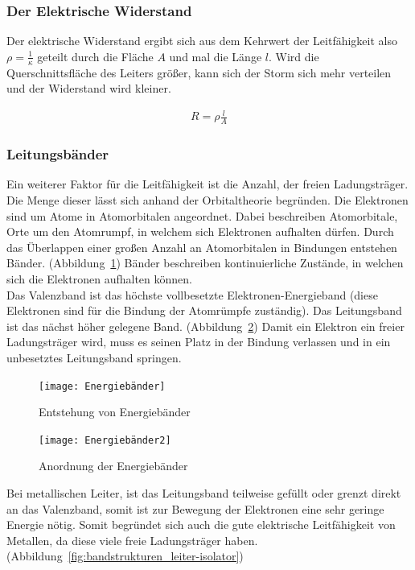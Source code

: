 \documentclass[a4paper]{scrartcl}
\numberwithin{equation}{subsection}
\begin{document}
\subsubsection{Der  Elektrische Widerstand}
Der elektrische Widerstand ergibt sich aus dem Kehrwert der Leitfähigkeit also $\rho = \frac{1}{\kappa}$ geteilt durch die Fläche $A$ und mal die Länge $l$.
Wird die Querschnittsfläche des Leiters größer, kann sich der Storm sich mehr verteilen und der Widerstand wird kleiner. \cite{werk}

\begin{align}
R = \rho \frac{l}{A}
\end{align}

\subsubsection{Leitungsbänder}
Ein weiterer Faktor für die Leitfähigkeit ist die Anzahl, der freien Ladungsträger. Die Menge dieser lässt sich anhand der Orbitaltheorie begründen.
Die Elektronen sind um Atome in Atomorbitalen angeordnet. Dabei beschreiben Atomorbitale, Orte um den Atomrumpf, in welchem sich Elektronen aufhalten dürfen. Durch das Überlappen einer großen Anzahl an Atomorbitalen in Bindungen entstehen Bänder. (Abbildung~\ref{fig:orbital-bänder}) 
Bänder beschreiben kontinuierliche Zustände, in welchen sich die Elektronen aufhalten können. \\
Das Valenzband ist das höchste vollbesetzte Elektronen-Energieband (diese Elektronen sind für die Bindung der Atomrümpfe zuständig). Das Leitungsband ist das nächst höher gelegene Band. (Abbildung~\ref{fig:energiebänder})
Damit ein Elektron ein freier Ladungsträger wird, muss es seinen Platz in der Bindung verlassen und in ein unbesetztes Leitungsband springen. \cite{werk}

\begin{figure}[H]
\texttt{[image: Energiebänder]}
\centering
\caption{Entstehung von Energiebänder \cite{tipler}}
\centering
\label{fig:orbital-bänder}
\end{figure}

\begin{figure}[H]
\texttt{[image: Energiebänder2]}
\centering
\caption{Anordnung der Energiebänder \cite{werk}}
\centering
\label{fig:energiebänder}
\end{figure}

Bei metallischen Leiter, ist das Leitungsband teilweise gefüllt oder grenzt direkt an das Valenzband, somit ist zur Bewegung der Elektronen eine sehr geringe Energie nötig. Somit begründet sich auch die gute elektrische Leitfähigkeit von Metallen, da diese viele freie Ladungsträger haben. (Abbildung~\ref{fig:bandstrukturen_leiter-isolator}) \\
\end{document}
